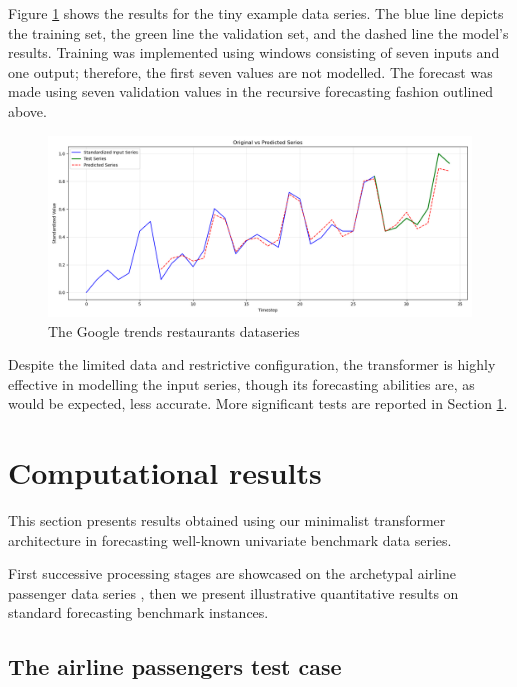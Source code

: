 \documentclass[algorithms,article,submit,pdftex,moreauthors]{Definitions/mdpi}
\begin{document}
Figure \ref{fig:restaurants} shows the results for the tiny example data series. The blue line depicts the training set, the green line the validation set, and the dashed line the model's results. Training was implemented using windows consisting of seven inputs and one output; therefore, the first seven values are not modelled. The forecast was made using seven validation values in the recursive forecasting fashion outlined above.

\begin{figure}
    \centering
    \includegraphics[width=0.95\linewidth]{restaurants.png}
    \caption{The Google trends restaurants dataseries}
    \label{fig:restaurants}
\end{figure}

Despite the limited data and restrictive configuration, the transformer is highly effective in modelling the input series, though its forecasting abilities are, as would be expected, less accurate. More significant tests are reported in Section \ref{sec:results}.

\section{Computational results} \label{sec:results}

This section presents results obtained using our minimalist transformer architecture in forecasting well-known univariate benchmark data series.

First successive processing stages are showcased on the archetypal airline passenger data series \citep{BJ70}, then we present illustrative quantitative results on standard forecasting benchmark instances.

\subsection{The airline passengers test case} \label{subsec:airlines}
\end{document}
